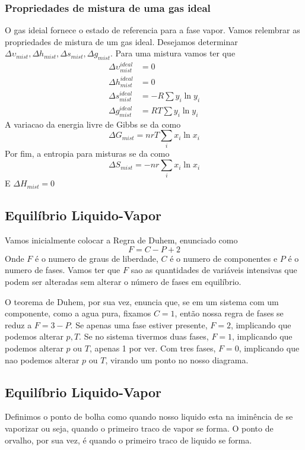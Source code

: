 \subsubsection{Propriedades de mistura de uma gas ideal}
O gas ideial fornece o estado de referencia para a fase vapor. Vamos relembrar as propriedades de mistura
de um gas ideal. Desejamos determinar \(\Delta \upsilon_{mist}, \Delta h_{mist}, \Delta s_{mist}, 
\Delta g_{mist} \). Para uma mistura vamos ter que
\begin{align}
    \Delta \upsilon_{mist}^{ideal} &= 0\\
    \Delta h_{mist}^{ideal} &= 0\\
    \Delta s_{mist}^{ideal} &= -R \sum y_i \ln y_i\\
    \Delta g_{mist}^{ideal} &= RT \sum y_i \ln y_i
\end{align}
A variacao da energia livre de Gibbs se da como
\begin{equation}
    \Delta G_{mist} = nrT \sum_i x_i \ln x_i
\end{equation}
Por fim, a entropia para misturas se da como 
\begin{equation}
    \Delta S_{mist} = -nr \sum_i x_i \ln x_i
\end{equation}
E \(\Delta H_{mist} = 0\)
\subsection{Equilíbrio Liquido-Vapor}
Vamos inicialmente colocar a Regra de Duhem, enunciado como
\begin{equation}
    F = C - P + 2
\end{equation}
Onde \(F\) é o numero de graus de liberdade, \(C\) é o numero de componentes e \(P\) é o numero de
fases. Vamos ter que \(F\) sao as quantidades de variáveis intensivas que podem ser alteradas sem
alterar o número de fases em equilíbrio. \par

O teorema de Duhem, por sua vez, enuncia que, se em um sistema com um componente, como a agua pura,
fixamos \(C = 1\), então nossa regra de fases se reduz a \(F = 3- P\). Se apenas uma fase estiver
presente, \(F = 2\), implicando que podemos alterar \(p, T\). Se no sistema tivermos duas fases,
\(F = 1\), implicando que podemos alterar \(p\) ou \(T\), apenas 1 por ver. Com tres fases, \(F =
0\), implicando que nao podemos alterar \(p\) ou \(T\), virando um ponto no nosso diagrama. \par

\subsection{Equilíbrio Liquido-Vapor}
Definimos o ponto de bolha como quando nosso liquido esta na iminência de se vaporizar ou seja,
quando o primeiro traco de vapor se forma. O ponto de orvalho, por sua vez, é quando o primeiro
traco de liquido se forma. \par

